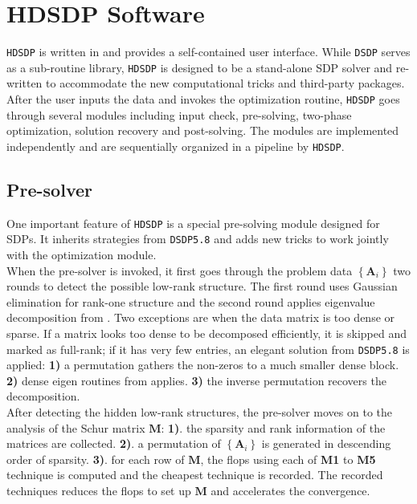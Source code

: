 \section{HDSDP Software}\label{sec5}

{{\texttt{HDSDP}}} is written in  and provides a
self-contained user interface. While {{\texttt{DSDP}}} serves as a sub-routine library, 
{{\texttt{HDSDP}}} is designed to be a stand-alone SDP solver and re-written to accommodate the 
new computational tricks and third-party packages.  After the user inputs the data and invokes the
optimization routine, {{\texttt{HDSDP}}} goes through several modules
including input check, pre-solving, two-phase optimization, solution recovery
and post-solving. The modules are implemented independently and are
sequentially organized in a pipeline by {{\texttt{HDSDP}}}.

\subsection{Pre-solver}

One important feature of {{\texttt{HDSDP}}} is a special pre-solving module
 designed for SDPs. It inherits strategies from
{{\texttt{DSDP5.8}}} and adds new tricks to work jointly with the
optimization module.\\

When the pre-solver is invoked, it first goes through the problem data
$\left\{ \mathbf{A}_i \right\}$ two rounds to detect the possible low-rank structure.
The first round uses Gaussian elimination for rank-one structure and the
second round applies eigenvalue decomposition from . Two
exceptions are when the data matrix is too dense or sparse. If a matrix looks
too dense to be decomposed efficiently, it is skipped and marked as full-rank;
if it has very few entries, an elegant solution from {{\texttt{DSDP5.8}}} is
applied: {\textbf{1)}} a permutation gathers the non-zeros to a much smaller
dense block. {\textbf{2)}} dense eigen routines from 
applies. {\textbf{3)}} the inverse permutation recovers the decomposition.\\

After detecting the hidden low-rank structures, the pre-solver moves on to
the analysis of the Schur matrix $\mathbf{M}$: {\textbf{1)}}. the sparsity and rank
information of the matrices are collected. {\textbf{2)}}. a permutation of
$\left\{ \mathbf{A}_i \right\}$ is generated in descending order of sparsity.
{\textbf{3)}}. for each row of $\mathbf{M}$, the flops using each of {\textbf{M1}}
to {\textbf{M5}} technique is computed and the cheapest technique is
recorded. The recorded techniques reduces the flops to set up $\mathbf{M}$ and
accelerates the convergence.\\

